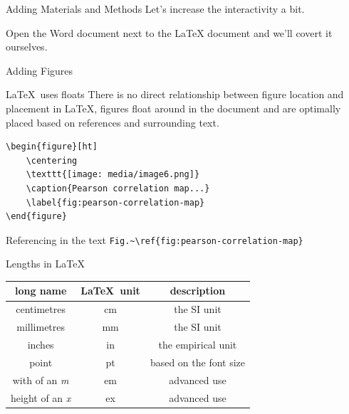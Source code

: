 \documentclass[final,aspectratio=43]{beamer}
\begin{document}
\begin{frame}{Adding Materials and Methods}
    Let's increase the interactivity a bit.
    
    Open the Word document next to the LaTeX document and we'll covert it ourselves.  
\end{frame}


\begin{frame}[fragile]{Adding Figures}
    \begin{block}{\LaTeX\ uses floats}
        There is no direct relationship between figure location and placement in \LaTeX, figures float around in the document and are optimally placed based on references and surrounding text. 
    \end{block}
    
    \begin{lstlisting}[basicstyle=\ttfamily\small]
\begin{figure}[ht]
    \centering
    \texttt{[image: media/image6.png]}
    \caption{Pearson correlation map...}
    \label{fig:pearson-correlation-map}
\end{figure}
    \end{lstlisting}
    
    \begin{block}{Referencing in the text}
        \texttt{Fig.\~{}\textbackslash ref\{fig:pearson-correlation-map\}}
    \end{block}
\end{frame}

\begin{frame}{Lengths in \LaTeX}
    \centering
    \begin{tabular}{ccc}
        long name & \LaTeX\ unit & description \\
        \hline
        centimetres & cm & the SI unit\\
        millimetres & mm & the SI unit\\
        inches & in & the empirical unit\\
        point & pt & based on the font size\\
        with of an \emph{m} & em & advanced use \\
        height of an \emph{x} & ex & advanced use\\
    \end{tabular}
    
\end{frame}
\end{document}
